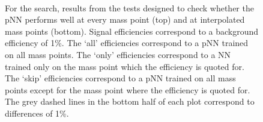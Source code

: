 \begin{figure}
    \centering
     \\
    \caption[pNN Validation Tests in the \XYttHgg Search]{For the \XYttHgg search, results from the tests designed to check whether the pNN performs well at every mass point (top) and at interpolated mass points (bottom). Signal efficiencies correspond to a background efficiency of 1\%. The `all' efficiencies correspond to a pNN trained on all mass points. The `only' efficiencies correspond to a NN trained only on the mass point which the efficiency is quoted for. The `skip' efficiencies correspond to a pNN trained on all mass points except for the mass point where the efficiency is quoted for. The grey dashed lines in the bottom half of each plot correspond to differences of 1\%.}\label{fig:param_tests_y_tautau}
\end{figure}

